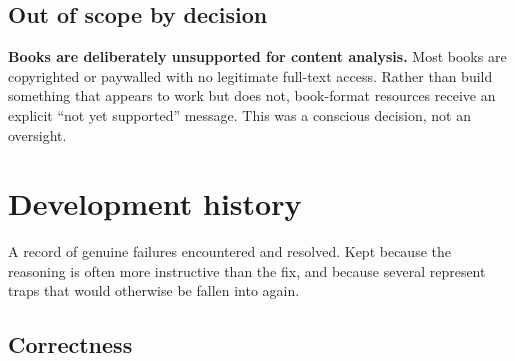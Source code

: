 \documentclass[11pt,a4paper]{article}
\begin{document}
\subsection{Out of scope by decision}

\textbf{Books are deliberately unsupported for content analysis.} Most books
are copyrighted or paywalled with no legitimate full-text access. Rather than
build something that appears to work but does not, book-format resources
receive an explicit ``not yet supported'' message. This was a conscious
decision, not an oversight.

\newpage
\section{Development history}

A record of genuine failures encountered and resolved. Kept because the
reasoning is often more instructive than the fix, and because several
represent traps that would otherwise be fallen into again.

\subsection{Correctness}
\end{document}
